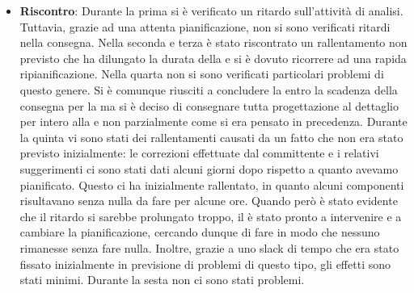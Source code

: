 \begin{itemize}
				\item \textbf{Riscontro}: Durante la prima  si è verificato un ritardo sull’attività di analisi. Tuttavia, grazie ad una attenta pianificazione, non si sono verificati ritardi nella consegna. Nella seconda e terza  è stato riscontrato un rallentamento non previsto che ha dilungato la durata della  e si è dovuto ricorrere ad una rapida ripianificazione. Nella quarta  non si sono verificati particolari problemi di questo genere. Si è comunque riusciti a concludere la  entro la scadenza della consegna per la  ma si è deciso di consegnare tutta progettazione al dettaglio per intero alla  e non parzialmente come si era pensato in precedenza. Durante la quinta  vi sono stati dei rallentamenti causati da un fatto che non era stato previsto inizialmente: le correzioni effettuate dal committente e i relativi suggerimenti ci sono stati dati alcuni giorni dopo rispetto a quanto avevamo pianificato. Questo ci ha inizialmente rallentato, in quanto alcuni componenti risultavano senza nulla da fare per alcune ore. Quando però è stato evidente che il ritardo si sarebbe prolungato troppo, il  è stato pronto a intervenire e a cambiare la pianificazione, cercando dunque di fare in modo che nessuno rimanesse senza fare nulla. Inoltre, grazie a uno slack di tempo che era stato fissato inizialmente in previsione di problemi di questo tipo, gli effetti sono stati minimi. Durante la sesta  non ci sono stati problemi.
			\end{itemize}

